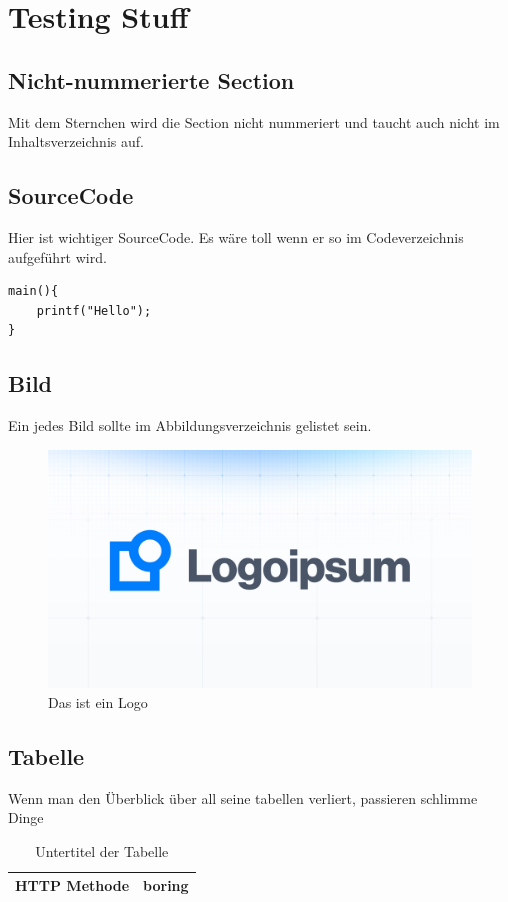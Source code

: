 \chapter{Testing Stuff}
\section*{Nicht-nummerierte Section}
Mit dem Sternchen wird die Section nicht nummeriert und taucht auch nicht im Inhaltsverzeichnis auf.


\section{SourceCode}
Hier ist wichtiger SourceCode. Es wäre toll wenn er so im Codeverzeichnis aufgeführt wird.
\begin{lstlisting}[caption=Test um SourceCode zu zeigen, label=codeExample]
main(){
    printf("Hello");
}
\end{lstlisting}

\section{Bild}
Ein jedes Bild sollte im Abbildungsverzeichnis gelistet sein.
\begin{figure}[ht]
    \centering
    \includegraphics[width=\textwidth]{images/logoipsum.png}
    \caption{Das ist ein Logo}
    \label{fig:ExampleImage}
\end{figure}


\section{Tabelle}
Wenn man den Überblick über all seine tabellen verliert, passieren schlimme Dinge
\begin{table}[H]
    \centering
    \begin{tabular}{|c|c|}
        \hline
        HTTP Methode & boring \\
        \hline
    \end{tabular}
    \caption{Untertitel der Tabelle}
    \label{tab:Requests}
\end{table}

